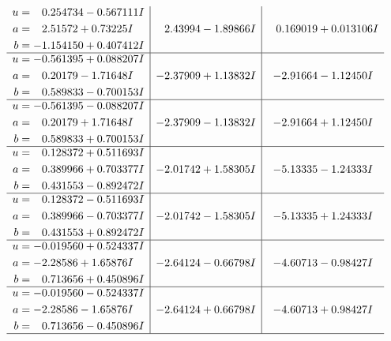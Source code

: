 \documentclass[1p]{elsarticle_modified}
\theoremstyle{definition}
\begin{document}
$$\begin{array}{c|c|c}
\begin{aligned}
u &= \phantom{-}0.254734 - 0.567111 I \\
a &= \phantom{-}2.51572 + 0.73225 I \\
b &= -1.154150 + 0.407412 I\end{aligned}
 & \phantom{-}2.43994 - 1.89866 I & \phantom{-}0.169019 + 0.013106 I \\ \hline\begin{aligned}
u &= -0.561395 + 0.088207 I \\
a &= \phantom{-}0.20179 - 1.71648 I \\
b &= \phantom{-}0.589833 - 0.700153 I\end{aligned}
 & -2.37909 + 1.13832 I & -2.91664 - 1.12450 I \\ \hline\begin{aligned}
u &= -0.561395 - 0.088207 I \\
a &= \phantom{-}0.20179 + 1.71648 I \\
b &= \phantom{-}0.589833 + 0.700153 I\end{aligned}
 & -2.37909 - 1.13832 I & -2.91664 + 1.12450 I \\ \hline\begin{aligned}
u &= \phantom{-}0.128372 + 0.511693 I \\
a &= \phantom{-}0.389966 + 0.703377 I \\
b &= \phantom{-}0.431553 - 0.892472 I\end{aligned}
 & -2.01742 + 1.58305 I & -5.13335 - 1.24333 I \\ \hline\begin{aligned}
u &= \phantom{-}0.128372 - 0.511693 I \\
a &= \phantom{-}0.389966 - 0.703377 I \\
b &= \phantom{-}0.431553 + 0.892472 I\end{aligned}
 & -2.01742 - 1.58305 I & -5.13335 + 1.24333 I \\ \hline\begin{aligned}
u &= -0.019560 + 0.524337 I \\
a &= -2.28586 + 1.65876 I \\
b &= \phantom{-}0.713656 + 0.450896 I\end{aligned}
 & -2.64124 - 0.66798 I & -4.60713 - 0.98427 I \\ \hline\begin{aligned}
u &= -0.019560 - 0.524337 I \\
a &= -2.28586 - 1.65876 I \\
b &= \phantom{-}0.713656 - 0.450896 I\end{aligned}
 & -2.64124 + 0.66798 I & -4.60713 + 0.98427 I\\
 \hline 
 \end{array}$$\newpage\newpage\renewcommand{\arraystretch}{1}
\end{document}
